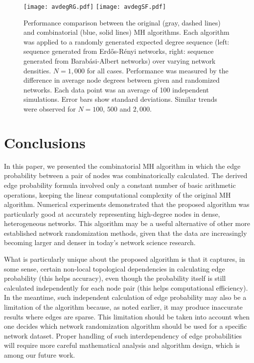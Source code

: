 \documentclass{llncs}
\begin{document}
\begin{figure}[t]
\texttt{[image: avdegRG.pdf]}
\texttt{[image: avdegSF.pdf]}
\caption{Performance comparison between the original (gray, dashed
  lines) and combinatorial (blue, solid lines) MH algorithms. Each
  algorithm was applied to a randomly generated expected degree
  sequence (left: sequence generated from Erd\H{o}s-R\'enyi networks,
  right: sequence generated from Barab\'{a}si-Albert networks) over
  varying network densities. $N=1,000$ for all cases. Performance was
  measured by the difference in average node degrees between given and
  randomized networks. Each data point was an average of 100
  independent simulations. Error bars show standard
  deviations. Similar trends were observed for $N = 100$, $500$ and
  $2,000$.}
\label{results2}
\end{figure}

\section{Conclusions}

In this paper, we presented the combinatorial MH algorithm in which
the edge probability between a pair of nodes was combinatorically
calculated. The derived edge probability formula involved only a
constant number of basic arithmetic operations, keeping the linear
computational complexity of the original MH algorithm. Numerical
experiments demonstrated that the proposed algorithm was particularly
good at accurately representing high-degree nodes in dense,
heterogeneous networks. This algorithm may be a useful alternative of
other more established network randomization methods, given that the
data are increasingly becoming larger and denser in today's network
science research.

What is particularly unique about the proposed algorithm is that it
captures, in some sense, certain non-local topological dependencies in
calculating edge probability (this helps accuracy), even though the
probability itself is still calculated independently for each node
pair (this helps computational efficiency). In the meantime, such
independent calculation of edge probability may also be a limitation
of the algorithm because, as noted earlier, it may produce inaccurate
results where edges are sparse. This limitation should be taken into
account when one decides which network randomization algorithm should
be used for a specific network dataset. Proper handling of such
interdependency of edge probabilities will require more careful
mathematical analysis and algorithm design, which is among our future
work.



\end{document}
